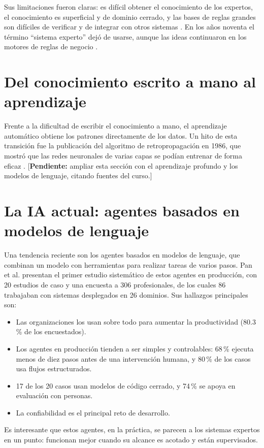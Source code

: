 \documentclass[11pt,a4paper]{article}
\begin{document}
Sus limitaciones fueron claras: es dif\'icil obtener el conocimiento de los expertos, el conocimiento es superficial y de dominio cerrado, y las bases de reglas grandes son dif\'iciles de verificar y de integrar con otros sistemas \cite{wikiES}. En los a\~nos noventa el t\'ermino ``sistema experto'' dej\'o de usarse, aunque las ideas continuaron en los motores de reglas de negocio \cite{wikiES}.

\section{Del conocimiento escrito a mano al aprendizaje}
Frente a la dificultad de escribir el conocimiento a mano, el aprendizaje autom\'atico obtiene los patrones directamente de los datos. Un hito de esta transici\'on fue la publicaci\'on del algoritmo de retropropagaci\'on en 1986, que mostr\'o que las redes neuronales de varias capas se pod\'ian entrenar de forma eficaz \cite{history}. [\textbf{Pendiente:} ampliar esta secci\'on con el aprendizaje profundo y los modelos de lenguaje, citando fuentes del curso.]

\section{La IA actual: agentes basados en modelos de lenguaje}
Una tendencia reciente son los agentes basados en modelos de lenguaje, que combinan un modelo con herramientas para realizar tareas de varios pasos. Pan et al. \cite{pan2026} presentan el primer estudio sistem\'atico de estos agentes en producci\'on, con 20 estudios de caso y una encuesta a 306 profesionales, de los cuales 86 trabajaban con sistemas desplegados en 26 dominios. Sus hallazgos principales son:
\begin{itemize}
  \item Las organizaciones los usan sobre todo para aumentar la productividad (80.3\,\% de los encuestados).
  \item Los agentes en producci\'on tienden a ser simples y controlables: 68\,\% ejecuta menos de diez pasos antes de una intervenci\'on humana, y 80\,\% de los casos usa flujos estructurados.
  \item 17 de los 20 casos usan modelos de c\'odigo cerrado, y 74\,\% se apoya en evaluaci\'on con personas.
  \item La confiabilidad es el principal reto de desarrollo.
\end{itemize}
Es interesante que estos agentes, en la pr\'actica, se parecen a los sistemas expertos en un punto: funcionan mejor cuando su alcance es acotado y est\'an supervisados.
\end{document}
